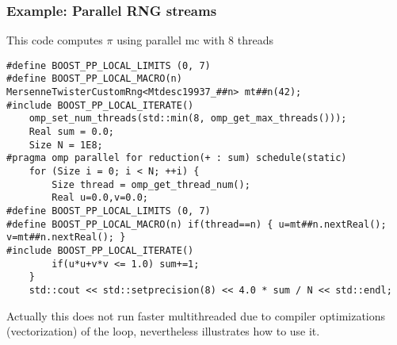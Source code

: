 \documentclass{beamer}
\begin{document}
\begin{frame}[fragile]
\frametitle{Example: Parallel RNG streams}
This code computes $\pi$ using parallel mc with $8$ threads
\vspace{2mm}
\begin{verbatim}
#define BOOST_PP_LOCAL_LIMITS (0, 7)
#define BOOST_PP_LOCAL_MACRO(n) MersenneTwisterCustomRng<Mtdesc19937_##n> mt##n(42);
#include BOOST_PP_LOCAL_ITERATE()
    omp_set_num_threads(std::min(8, omp_get_max_threads()));
    Real sum = 0.0;
    Size N = 1E8;
#pragma omp parallel for reduction(+ : sum) schedule(static)
    for (Size i = 0; i < N; ++i) {
        Size thread = omp_get_thread_num();
        Real u=0.0,v=0.0;
#define BOOST_PP_LOCAL_LIMITS (0, 7)
#define BOOST_PP_LOCAL_MACRO(n) if(thread==n) { u=mt##n.nextReal(); v=mt##n.nextReal(); }
#include BOOST_PP_LOCAL_ITERATE()
        if(u*u+v*v <= 1.0) sum+=1;
    }
    std::cout << std::setprecision(8) << 4.0 * sum / N << std::endl;
\end{verbatim}

Actually this does not run faster multithreaded due to compiler optimizations (vectorization) of the loop, nevertheless illustrates how to use it.
\end{frame}


\end{document}
